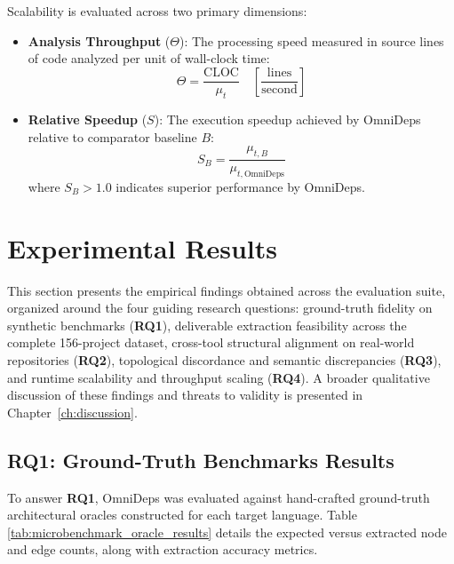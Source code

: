 Scalability is evaluated across two primary dimensions:
\begin{itemize}
  \item \textbf{Analysis Throughput} ($\Theta$): The processing speed
    measured in source lines of code analyzed per unit of wall-clock time:
    \begin{equation}
      \Theta = \frac{\text{CLOC}}{\mu_t} \quad
      \left[\frac{\text{lines}}{\text{second}}\right]
    \end{equation}
  \item \textbf{Relative Speedup} ($S$): The execution speedup
    achieved by OmniDeps relative to comparator baseline $B$:
    \begin{equation}
      S_{B} = \frac{\mu_{t, B}}{\mu_{t, \text{OmniDeps}}}
    \end{equation}
    where $S_B > 1.0$ indicates superior performance by OmniDeps.
\end{itemize}

\section{Experimental Results}
\label{sec:experimental_results}
\label{sec:experimental_results_discussion}

This section presents the empirical findings obtained across the
evaluation suite, organized around the four guiding research
questions: ground-truth fidelity on synthetic benchmarks (\textbf{RQ1}),
deliverable extraction feasibility across the complete 156-project
dataset, cross-tool structural alignment on real-world repositories
(\textbf{RQ2}), topological discordance and semantic discrepancies
(\textbf{RQ3}), and runtime scalability and throughput scaling
(\textbf{RQ4}). A broader qualitative discussion of these findings and
threats to validity is presented in Chapter~\ref{ch:discussion}.

\subsection{RQ1: Ground-Truth Benchmarks Results}
\label{subsec:results_rq1}

To answer \textbf{RQ1}, OmniDeps was evaluated against hand-crafted
ground-truth architectural oracles constructed for each target language. Table
\ref{tab:microbenchmark_oracle_results} details the expected versus
extracted node and edge counts, along with extraction
accuracy metrics.

